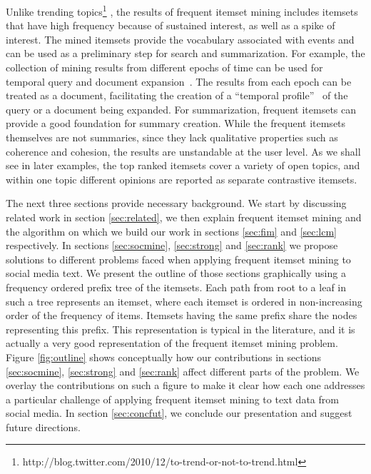 \documentclass{sig-alternate}
\begin{document}
Unlike trending
topics\footnote{http://blog.twitter.com/2010/12/to-trend-or-not-to-trend.html}
\cite{mathioudakis2010twittermonitor}, the results of frequent itemset
mining includes itemsets that have high frequency because of sustained interest,
as well as a spike of interest.
The mined itemsets provide the vocabulary associated with events and can be
used as a preliminary step for search and summarization.
For example, the collection of mining results from different epochs of time
can be used for temporal query and document
expansion~\cite{choi2012temporal, efron2012improving}.
The results from each epoch can be treated as a document, facilitating the
creation of a ``temporal profile''~\cite{jones2007temporal} of the query
or a document being expanded.
For summarization, frequent itemsets can provide a good foundation for summary
creation.
While the frequent itemsets themselves are not summaries, since they lack
qualitative properties such as coherence and cohesion, the results are
unstandable at the user level.
As we shall see in later examples, the top ranked itemsets cover a variety
of open topics, and within one topic different opinions are reported as
separate contrastive itemsets.

The next three sections provide necessary background.
We start by discussing related work in section \ref{sec:related},
we then explain frequent itemset mining and the algorithm on which we build
our work in sections \ref{sec:fim} and \ref{sec:lcm} respectively.
In sections \ref{sec:socmine}, \ref{sec:strong} and \ref{sec:rank} we
propose solutions to different problems faced when applying frequent
itemset mining to social media text.
We present the outline of those sections graphically using a
frequency ordered prefix tree of the itemsets.
Each path from root to a leaf in such a tree represents an itemset,
where each itemset is ordered in non-increasing order of the frequency of
items.
Itemsets having the same prefix share the nodes representing this prefix.
This representation is typical in the literature, and it is actually a very
good representation of the frequent itemset mining problem.
Figure \ref{fig:outline} shows conceptually how our contributions in sections  \ref{sec:socmine},
\ref{sec:strong} and \ref{sec:rank}  affect different parts of the
problem. We overlay the contributions on such a figure to make it clear how each one addresses a particular challenge of applying frequent itemset mining to text data from social media. In section \ref{sec:concfut}, we conclude our presentation and
suggest future directions.
\end{document}
